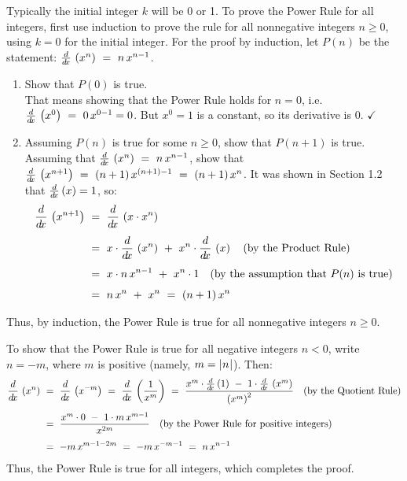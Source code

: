 Typically the initial integer $k$ will be 0 or 1. To prove the Power Rule for
all integers, first use induction to prove the rule for all nonnegative integers
$n \ge 0$, using $k = 0$ for the initial integer. For the proof by induction,
let $P(n)$ be the statement: $\frac{d}{d\!x}\,\left(x^n\right) ~=~ n\,x^{n-1}$.
\begin{enumerate}
 \item Show that $P(0)$ is true.\\That means showing that the Power
  Rule holds for $n = 0$, i.e. $\frac{d}{d\!x}\,\left(x^0\right) ~=~ 0\,x^{0-1} = 0$.
  But $x^0 = 1$ is a constant, so its derivative is 0. $\checkmark$
 \item Assuming $P(n)$ is true for some $n \ge 0$, show that $P(n+1)$ is true.\\Assuming
 that $\frac{d}{d\!x}\,\left(x^n\right) ~=~ n\,x^{n-1}$, show that
 $\frac{d}{d\!x}\,\left(x^{n+1}\right) ~=~ (n + 1)\,x^{(n+1)-1} ~=~ (n + 1)\,x^n$. It was
 shown in Section 1.2 that $\frac{d}{d\!x}\,(x) = 1$, so:
 \begin{align*}
  \frac{d}{d\!x}\,\left(x^{n+1}\right) ~&=~ \frac{d}{d\!x}\,\left( x \cdot x^n \right)\\[4pt]
  &=~ x \cdot \frac{d}{d\!x}\,\left(x^n\right) ~+~ x^n \cdot \frac{d}{d\!x}\,\left(x\right) \quad\text{(by the Product Rule)}\\[4pt]
  &=~ x \cdot n\,x^{n-1} ~+~ x^n \cdot 1 \quad\text{(by the assumption that $P(n)$ is true)}\\[4pt]
  &=~ n\,x^n ~+~ x^n ~=~ (n + 1)\,x^n \quad\relax
 \end{align*}
\end{enumerate}\vspace{-5mm}
\noindent Thus, by induction, the Power Rule is true for all nonnegative
integers $n \ge 0$.

To show that the Power Rule is true for all negative integers $n < 0$, write
$n = -m$, where $m$ is positive (namely, $m = \lvert\mspace{1mu}n\mspace{1mu}\rvert$). Then:
\begin{align*}
 \frac{d}{d\!x}\,\left(x^n\right) ~&=~ \frac{d}{d\!x}\,\left(x^{-m}\right) ~=~ \frac{d}{d\!x}\,\left(\frac{1}{x^m}\right) ~=~
  \frac{x^m \cdot \frac{d}{d\!x}\,(1) ~-~ 1 \cdot \frac{d}{d\!x}\,\left(x^m\right)}{\left(x^m\right)^2}
  \quad\text{(by the Quotient Rule)}\\[4pt]
 &=~ \frac{x^m \cdot 0 ~-~ 1 \cdot m\,x^{m-1}}{x^{2m}} \quad\text{(by the Power Rule for positive integers)}\\[4pt]
 &=~ -m\,x^{m-1-2m} ~=~ -m\,x^{-m-1} ~=~ n\,x^{n-1} \quad\relax
\end{align*}
Thus, the Power Rule is true for all integers, which completes the proof. \qedsymbol

